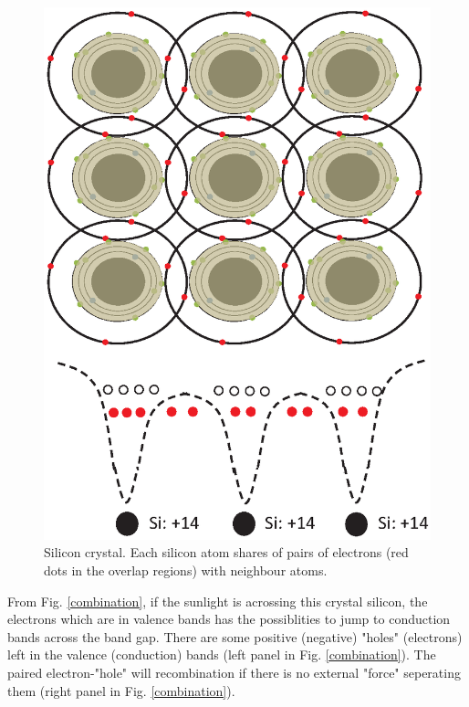 \documentclass[a4paper, 12pt, titlepage,oneside,drop]{kthesis}
\begin{document}
\begin{figure}[H]
\centering
\includegraphics[scale=.6]{crystal}
\caption{Silicon crystal. Each silicon atom shares of pairs of electrons (red dots in the overlap regions) with neighbour atoms.}
\label{crystal}
\end{figure}


From Fig. \ref{combination}, if the sunlight is acrossing this crystal silicon, the electrons which are in valence bands has the possiblities to jump to conduction bands across the band gap.
There are some positive (negative) "holes" (electrons) left in the valence (conduction) bands (left panel in Fig. \ref{combination}). The paired electron-"hole" will recombination if there is no external 
"force" seperating them (right panel in Fig. \ref{combination}).
\end{document}
